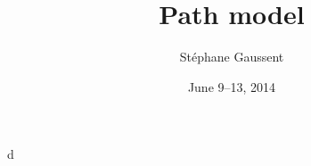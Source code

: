 \documentclass{article}
\title{Path model}
\author{St\'ephane Gaussent}
\date{June 9--13, 2014}
\begin{document}
\maketitle





d
\end{document}
